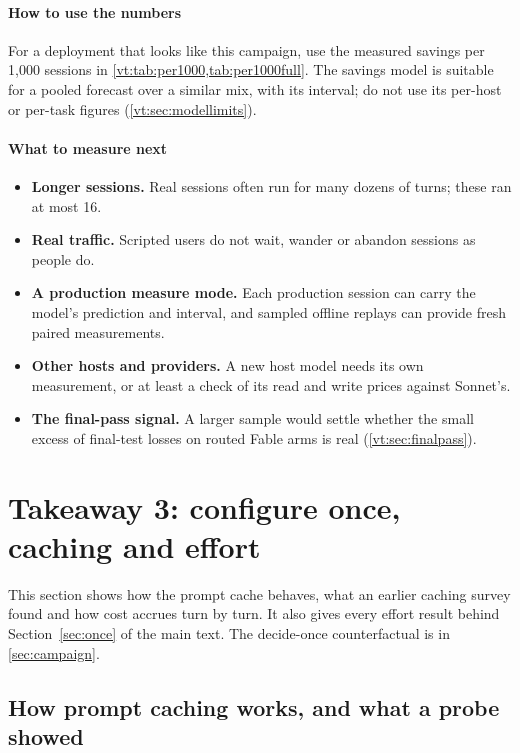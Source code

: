 \documentclass[11pt,letterpaper]{article}
\newcommand{\MaxTurns}{16}
\newcommand{\mainpaper}{the main text}\newcommand{\thissupp}{these appendices}\newcommand{\Thissupp}{These appendices}
\begin{document}
\paragraph{How to use the numbers} For a deployment that looks like this campaign, use the measured savings per 1,000
sessions in \cref{vt:tab:per1000,tab:per1000full}. The savings model is suitable for a pooled forecast over a similar
mix, with its interval; do not use its per-host or per-task figures (\cref{vt:sec:modellimits}).

\paragraph{What to measure next}
\begin{itemize}[leftmargin=1.2em]
  \item \textbf{Longer sessions.} Real sessions often run for many dozens of turns; these ran at most \MaxTurns.
  \item \textbf{Real traffic.} Scripted users do not wait, wander or abandon sessions as people do.
  \item \textbf{A production measure mode.} Each production session can carry the model's prediction and interval, and
    sampled offline replays can provide fresh paired measurements.
  \item \textbf{Other hosts and providers.} A new host model needs its own measurement, or at least a check of its read
    and write prices against Sonnet's.
  \item \textbf{The final-pass signal.} A larger sample would settle whether the small excess of final-test losses on
    routed Fable arms is real (\cref{vt:sec:finalpass}).
\end{itemize}
\section{Takeaway 3: configure once, caching and effort}\label{sec:d}

This section shows how the prompt cache behaves, what an earlier caching survey found and how cost accrues turn by
turn. It also gives every effort result behind Section~\ref{sec:once} of \mainpaper{}. The decide-once counterfactual is in
\cref{sec:campaign}.

\subsection{How prompt caching works, and what a probe showed}\label{vt:sec:caching}
\end{document}
